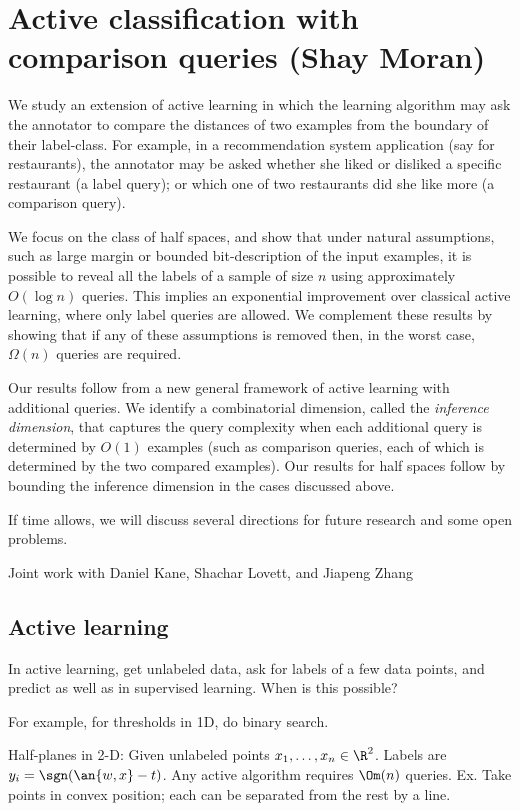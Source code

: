 \section{Active classification with comparison queries (Shay Moran)}

We study an extension of active learning in which the learning
algorithm may ask the annotator to compare the distances of two
examples from the boundary of their label-class. For example, in a
recommendation system application (say for restaurants), the annotator
may be asked whether she liked or disliked a specific restaurant (a
label query); or which one of two restaurants did she like more (a
comparison query).

We focus on the class of half spaces, and show that under natural
assumptions, such as large margin or bounded bit-description of the
input examples, it is possible to reveal all the labels of a sample of
size $n$ using approximately $O(\log n)$ queries. This implies an
exponential improvement over classical active learning, where only
label queries are allowed. We complement these results by showing that
if any of these assumptions is removed then, in the worst case,
$\Omega(n)$ queries are required.

Our results follow from a new general framework of active learning
with additional queries. We identify a combinatorial dimension, called
the \emph{inference dimension}, that captures the query complexity
when each additional query is determined by $O(1)$ examples (such as
comparison queries, each of which is determined by the two compared
examples). Our results for half spaces follow by bounding the
inference dimension in the cases discussed above.

If time allows, we will discuss several directions for future research
and some open problems.

Joint work with Daniel Kane, Shachar Lovett, and Jiapeng Zhang

\subsection{Active learning}

In active learning, get unlabeled data, ask for labels of a few data points, and predict as well as in supervised learning. When is this possible?

For example, for thresholds in 1D, do binary search.

Half-planes in 2-D: Given unlabeled points $x_1,\ldots, x_n\in \R^2$. Labels are $y_i = \sgn(\an{w,x}-t)$. Any active algorithm requires $\Om(n)$ queries. Ex. Take points in convex position; each can be separated from the rest by a line.

